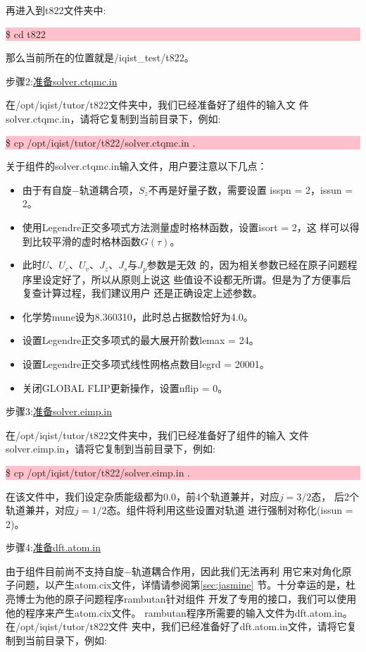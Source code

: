再进入到t822文件夹中:

\noindent\colorbox{pink}{\parbox[r]{\linewidth}{\quad \$ cd t822 }}

那么当前所在的位置就是/iqist\_test/t822。

步骤2:\underline{准备solver.ctqmc.in}

在/opt/iqist/tutor/t822文件夹中，我们已经准备好了{\lavender}组件的输入文
件solver.ctqmc.in，请将它复制到当前目录下，例如:

\noindent\colorbox{pink}{\parbox[r]{\linewidth}{\quad \$ cp /opt/iqist/tutor/t822/solver.ctqmc.in . }}

关于{\lavender}组件的solver.ctqmc.in输入文件，用户要注意以下几点：
\begin{itemize}
  \item 由于有自旋$-$轨道耦合项，$S_{z}$不再是好量子数，需要设置
        isspn = 2，issun = 2。
  \item 使用Legendre正交多项式方法测量虚时格林函数，设置isort = 2，这
        样可以得到比较平滑的虚时格林函数$G(\tau)$。
  \item 此时$U$、$U_{c}$、$U_{v}$、$J_{z}$、$J_{s}$与$J_{p}$参数是无效
        的，因为相关参数已经在原子问题程序里设定好了，所以从原则上说这
        些值设不设都无所谓。但是为了方便事后复查计算过程，我们建议用户
        还是正确设定上述参数。
  \item 化学势mune设为8.360310，此时总占据数恰好为4.0。
  \item 设置Legendre正交多项式的最大展开阶数lemax = 24。
  \item 设置Legendre正交多项式线性网格点数目legrd = 20001。
  \item 关闭GLOBAL FLIP更新操作，设置nflip = 0。
\end{itemize}

步骤3:\underline{准备solver.eimp.in}

在/opt/iqist/tutor/t822文件夹中，我们已经准备好了{\lavender}组件的输入
文件solver.eimp.in，请将它复制到当前目录下，例如:

\noindent\colorbox{pink}{\parbox[r]{\linewidth}{\quad \$ cp /opt/iqist/tutor/t822/solver.eimp.in . }}

在该文件中，我们设定杂质能级都为0.0，前4个轨道兼并，对应$j = 3/2$态，
后2个轨道兼并，对应$j = 1/2$态。{\lavender}组件将利用这些设置对轨道
进行强制对称化(issun = 2)。

步骤4:\underline{准备dft.atom.in}

由于{\jasmine}组件目前尚不支持自旋$-$轨道耦合作用，因此我们无法再利
用它来对角化原子问题，以产生atom.cix文件，详情请参阅第\ref{sec:jasmine}
节。十分幸运的是，杜亮博士为他的原子问题程序rambutan针对{\lavender}组件
开发了专用的接口，我们可以使用他的程序来产生atom.cix文件。
rambutan程序所需要的输入文件为dft.atom.in。在/opt/iqist/tutor/t822文件
夹中，我们已经准备好了dft.atom.in文件，请将它复制到当前目录下，例如:

